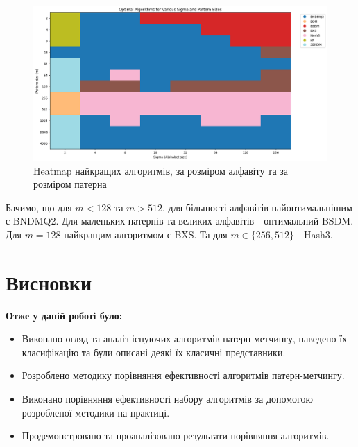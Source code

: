 \documentclass[a4paper,14pt]{extarticle} %
\begin{document}
			\begin{figure}[H]
				\centering
				\includegraphics[width=1\textwidth]{images/sigma_results.png}
				\caption{Heatmap найкращих алгоритмів, за розміром алфавіту та за розміром патерна}
				\label{fig:sigma_results}
			\end{figure}

			Бачимо, що для $m<128$ та $m>512$, для більшості алфавітів найоптимальнішим є BNDMQ2. Для маленьких патернів та великих алфавітів - оптимальний BSDM.
			Для $m=128$ найкращим алгоритмом є BXS. Та для $m\in \{256,512\}$ - Hash3.
	\newpage
    \section*{Висновки}
	\textbf{Отже у даній роботі було:}
	\begin{itemize}
		\item Виконано огляд та аналіз існуючих алгоритмів патерн-метчингу, наведено їх класифікацію та були описані деякі їх класичні представники.
		\item Розроблено методику порівняння ефективності алгоритмів патерн-метчингу.
		\item Виконано порівняння ефективності набору алгоритмів за допомогою розробленої методики на практиці.
		\item Продемонстровано та проаналізовано результати порівняння алгоритмів.
	\end{itemize}
\end{document}
